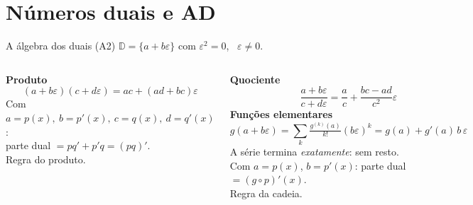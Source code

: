 \documentclass[aspectratio=169,11pt]{beamer}
\begin{document}
\section{Números duais e AD}

\begin{frame}{A álgebra dos duais (A2)}
  $\mathbb D = \{a+b\varepsilon\}$ com \alert{$\varepsilon^2=0$}, \ $\varepsilon\ne0$.
  \vspace{0.4em}
  \begin{columns}[T]
    \textbf{Produto}
    \[ (a+b\varepsilon)(c+d\varepsilon) = ac + (ad+bc)\varepsilon \]
    Com $a=p(x),\ b=p'(x),\ c=q(x),\ d=q'(x)$:\\
    parte dual $= pq'+p'q = (pq)'$.\\
    \alert{Regra do produto.}
    \vspace{0.6em}

    \textbf{Quociente}
    \[ \frac{a+b\varepsilon}{c+d\varepsilon} = \frac ac + \frac{bc-ad}{c^2}\varepsilon \]
    \textbf{Funções elementares}
    \[ g(a+b\varepsilon) = \sum_k \tfrac{g^{(k)}(a)}{k!}(b\varepsilon)^k = g(a)+g'(a)\,b\,\varepsilon \]
    A série termina \emph{exatamente}: sem resto.\\[0.3em]
    Com $a=p(x)$, $b=p'(x)$: parte dual $=(g\circ p)'(x)$.\\
    \alert{Regra da cadeia.}
  \end{columns}
\end{frame}
\end{document}
